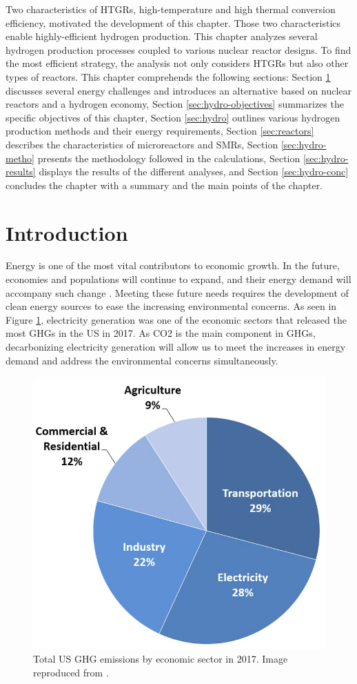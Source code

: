 \label{ch:hydro}

Two characteristics of HTGRs, high-temperature and high thermal conversion efficiency, motivated the development of this chapter.
Those two characteristics enable highly-efficient hydrogen production.
This chapter analyzes several hydrogen production processes coupled to various nuclear reactor designs.
To find the most efficient strategy, the analysis not only considers HTGRs but also other types of reactors.
This chapter comprehends the following sections:
Section \ref{sec:hydro-intro} discusses several energy challenges and introduces an alternative based on nuclear reactors and a hydrogen economy,
Section \ref{sec:hydro-objectives} summarizes the specific objectives of this chapter,
Section \ref{sec:hydro} outlines various hydrogen production methods and their energy requirements, 
Section \ref{sec:reactors} describes the characteristics of microreactors and \glspl{SMR},
Section \ref{sec:hydro-metho} presents the methodology followed in the calculations, 
Section \ref{sec:hydro-results} displays the results of the different analyses,
and Section \ref{sec:hydro-conc} concludes the chapter with a summary and the main points of the chapter.

\section{Introduction}
\label{sec:hydro-intro}

Energy is one of the most vital contributors to economic growth.
In the future, economies and populations will continue to expand, and their energy demand will accompany such change \cite{burke_impact_2018} \cite{el-shafie_hydrogen_2019}.
Meeting these future needs requires the development of clean energy sources to ease the increasing environmental concerns.
As seen in Figure \ref{fig:ghg}, electricity generation was one of the economic sectors that released the most \glspl{GHG} in the \gls{US} in 2017.
As \gls{CO2} is the main component in \glspl{GHG}, decarbonizing electricity generation will allow us to meet the increases in energy demand and address the environmental concerns simultaneously.

\begin{figure}[htbp!]
	\centering
	\includegraphics[width=0.4\linewidth]{figures-hydro/total-ghg-2017.png}
	\hfill
	\caption{Total US GHG emissions by economic sector in 2017. Image reproduced from \cite{us_epa_sources_2020}.}
	\label{fig:ghg}
\end{figure}

